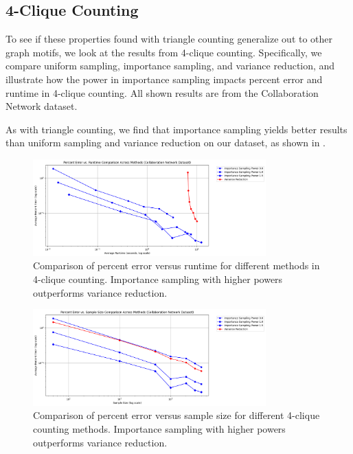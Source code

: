 \documentclass[11pt, margin=1in]{article}
\begin{document}
\subsection{4-Clique Counting}

To see if these properties found with triangle counting generalize out to other graph motifs, we look at the results from 4-clique counting.
Specifically, we compare uniform sampling, importance sampling, and variance reduction, and illustrate how the power in importance sampling impacts percent error and runtime in 4-clique counting.
All shown results are from the Collaboration Network dataset.

As with triangle counting, we find that importance sampling yields better results than uniform sampling and variance reduction on our dataset, as shown in .

\begin{figure}[H]
    \centering
    \includegraphics[width=0.8\textwidth]{plots/4-clique/comparison/percent_error_vs_runtime_comparison.png}
    \caption{Comparison of percent error versus runtime for different methods in 4-clique counting. Importance sampling with higher powers outperforms variance reduction.}
    \label{fig:4_clique_percent_error_runtime_comparison}
\end{figure}

\begin{figure}[H]
    \centering
    \includegraphics[width=0.8\textwidth]{plots/4-clique/comparison/percent_error_vs_sample_size_comparison.png}
    \caption{Comparison of percent error versus sample size for different 4-clique counting methods. Importance sampling with higher powers outperforms variance reduction.}
    \label{fig:4_clique_percent_error_sample_size_comparison}
\end{figure}
\end{document}
